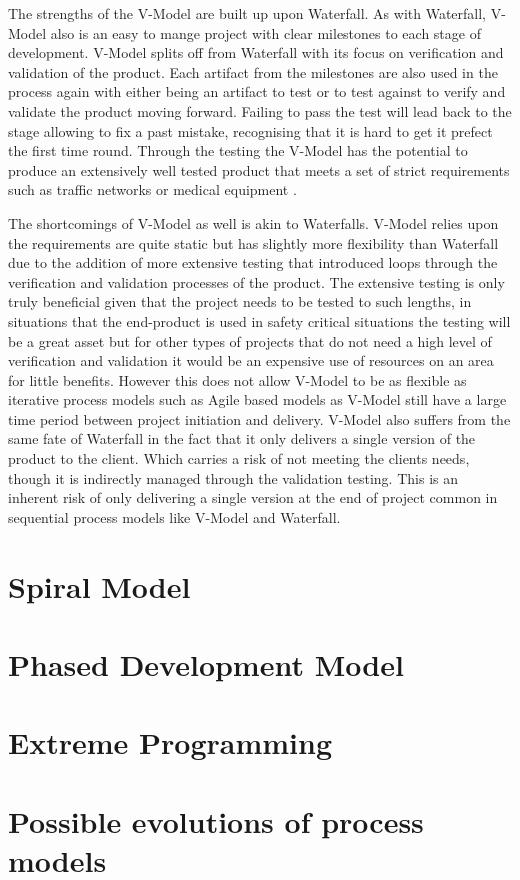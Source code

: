 \documentclass{style/CRPITStyle}
\renewcommand{\cite}{\citep}
\begin{document}
The strengths of the V-Model are built up upon Waterfall.
As with Waterfall, V-Model also is an easy to mange project with clear milestones
to each stage of development.
V-Model splits off from Waterfall with its focus
on verification and validation of the product.
Each artifact from the milestones are also used in the process again with either
being an artifact to test or to test against to verify and validate the product
moving forward. Failing to pass the test will lead back to the stage allowing to
fix a past mistake, recognising that it is hard to get it prefect the first time
round.
Through the testing the V-Model has the potential to produce an extensively well
tested product that meets a set of strict requirements such as traffic networks
or medical equipment \cite{Advancements:2010}.

\vspace{.1in}

The shortcomings of V-Model as well is akin to Waterfalls.
V-Model relies upon the requirements are quite static but has slightly more
flexibility than Waterfall due to the addition of more extensive testing that introduced loops 
through the verification and validation processes of the product. 
The extensive testing is only truly beneficial given that the project needs to
be tested to such lengths, in situations that the end-product is used in safety
critical situations the testing will be a great asset but for other types of
projects that do not need a high level of verification and validation it would
be an expensive use of resources on an area for little benefits.
However this does not allow V-Model to be as flexible as iterative process models such as
Agile based models as V-Model still have a large time period between project
initiation and delivery. 
V-Model also suffers from the same fate of Waterfall in the fact that it only
delivers a single version of the product to the client. Which carries a risk of 
not meeting the clients needs, though it is indirectly managed through the validation testing.
This is an inherent risk of only delivering a single version at the end
of project common in sequential process models like V-Model and Waterfall.

\section{Spiral Model} %
\cite{Boehm:1988}

\section{Phased Development Model} %

\section{Extreme Programming} %

\section{Possible evolutions of process models}




\end{document}
